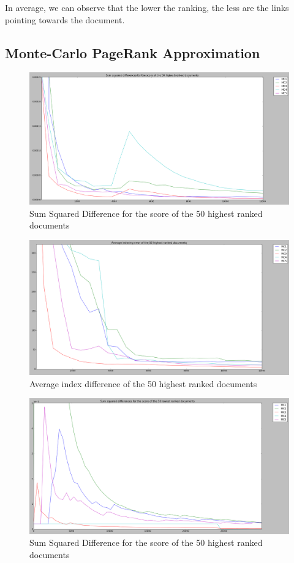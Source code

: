 \begin{itemize}
In average, we can observe that the lower the ranking, the less are the links pointing towards the document.


\subsection{Monte-Carlo PageRank Approximation}
\begin{figure}[H]
\centering
\includegraphics[width=0.8\linewidth]{img/high.png}
\caption{Sum Squared Difference for the score of the 50 highest ranked documents}
\end{figure}

\begin{figure}[H]
\centering
\includegraphics[width=0.8\linewidth]{img/high_idx.png}
\caption{Average index difference of the 50 highest ranked documents}
\end{figure}

\begin{figure}[H]
\centering
\includegraphics[width=0.8\linewidth]{img/low.png}
\caption{Sum Squared Difference for the score of the 50 highest ranked documents}
\end{figure}


\end{itemize}
